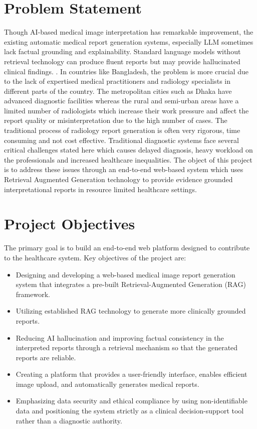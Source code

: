 \section{Problem Statement}
Though AI-based medical image interpretation has remarkable improvement, the existing automatic medical report generation systems, especially LLM sometimes lack factual grounding and explainability. Standard language models without retrieval technology can produce fluent reports but may provide hallucinated clinical findings.\cite{Xiong2024,Zhao2025}
. 
In countries like Bangladesh, the problem is more crucial due to the lack of expertised medical practitioners and  radiology specialists in different parts of the country. The metropolitan cities such as Dhaka have advanced diagnostic facilities whereas the rural and semi-urban areas have a limited number of radiologists which increase their work pressure and affect the report quality or misinterpretation due to the high number of cases. The traditional process of radiology report generation is often very rigorous, time consuming and not cost effective. 
Traditional diagnostic systems face several critical challenges stated here which causes delayed diagnosis, heavy workload on the professionals and increased healthcare inequalities. The object of this project is to address these issues through an end-to-end web-based system which uses Retrieval Augmented Generation technology to provide evidence grounded interpretational reports in resource limited healthcare settings.


\section{Project Objectives}
The primary goal is to build an end-to-end web platform designed to contribute to the healthcare system. Key objectives of the project are:

\begin{itemize}
    \item Designing and developing a web-based medical image report generation system that integrates a pre-built Retrieval-Augmented Generation (RAG) framework.
    \item Utilizing established RAG technology to generate more clinically grounded reports.
    \item Reducing AI hallucination and improving factual consistency in the interpreted reports through a retrieval mechanism so that the generated reports are reliable.
    \item Creating a platform that provides a user-friendly interface, enables efficient image upload, and automatically generates medical reports.
    \item Emphasizing data security and ethical compliance by using non-identifiable data and positioning the system strictly as a clinical decision-support tool rather than a diagnostic authority.
\end{itemize}

